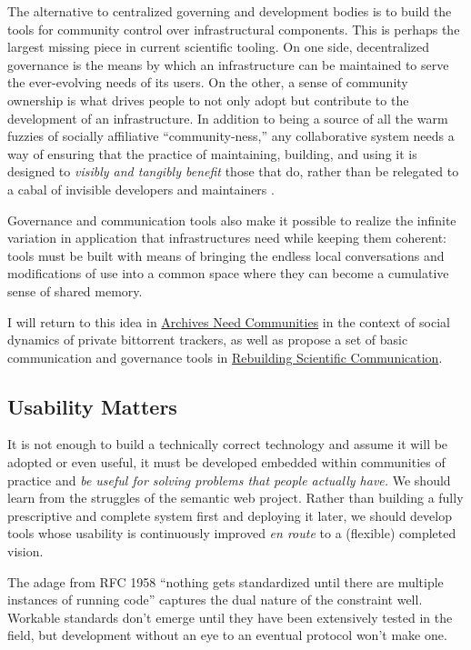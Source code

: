 The alternative to centralized governing and development bodies is to
build the tools for community control over infrastructural components.
This is perhaps the largest missing piece in current scientific tooling.
On one side, decentralized governance is the means by which an
infrastructure can be maintained to serve the ever-evolving needs of its
users. On the other, a sense of community ownership is what drives
people to not only adopt but contribute to the development of an
infrastructure. In addition to being a source of all the warm fuzzies of
socially affiliative ``community-ness,'' any collaborative system needs
a way of ensuring that the practice of maintaining, building, and using
it is designed to \emph{visibly and tangibly benefit} those that do,
rather than be relegated to a cabal of invisible developers and
maintainers \citep{grudinGroupwareSocialDynamics1994, randallDistributedOntologyBuilding2011} .

Governance and communication tools also make it possible to realize the
infinite variation in application that infrastructures need while
keeping them coherent: tools must be built with means of bringing the
endless local conversations and modifications of use into a common space
where they can become a cumulative sense of shared memory.

I will return to this idea in
\protect\hyperlink{archives-need-communities}{Archives Need Communities}
in the context of social dynamics of private bittorrent trackers, as
well as propose a set of basic communication and governance tools in
\protect\hyperlink{rebuilding-scientific-communication}{Rebuilding
Scientific Communication}.

\hypertarget{usability-matters}{%
\subsection{Usability Matters}\label{usability-matters}}

It is not enough to build a technically correct technology and assume it
will be adopted or even useful, it must be developed embedded within
communities of practice and \emph{be useful for solving problems that
people actually have.} We should learn from the struggles of the
semantic web project. Rather than building a fully prescriptive and
complete system first and deploying it later, we should develop tools
whose usability is continuously improved \emph{en route} to a (flexible)
completed vision.

The adage from RFC 1958 ``nothing gets
standardized until there are multiple instances of running code'' \citep{carpenterRFC1958Architectural1996}  captures the dual nature of
the constraint well. Workable standards don't emerge until they have
been extensively tested in the field, but development without an eye to
an eventual protocol won't make one.


